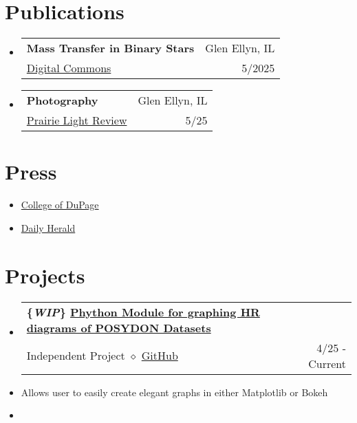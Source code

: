\documentclass[letterpaper,11pt]{article}
\makeatletter
\newcommand{\cvitem}[1]{
  \item\small{
    {#1\vspace{-2pt}}
  }
}
\newcommand{\cvheading}[4]{
  \vspace{-2pt}\item
    \begin{tabular*}{\textwidth}[t]{l@{\extracolsep{\fill}}r}
      \textbf{#1} & #2 \\
      \small#3 & \small #4 \\
    \end{tabular*}\vspace{-7pt}
}
\newcommand{\cvheadingstart}{\begin{itemize}[leftmargin=0in, label={}]}
\newcommand{\cvheadingend}{\end{itemize}}
\newcommand{\cvitemstart}{\begin{itemize}[label=\textopenbullet]\justifying}
\newcommand{\cvitemend}{\end{itemize}\vspace{-5pt}}
\makeatother
\begin{document}
\section{Publications}
  \cvheadingstart
  \cvheading
    {Mass Transfer in Binary Stars}
    {Glen Ellyn, IL}
    {\href{https://dc.cod.edu/srs/2025/schedule/25/}{Digital Commons}}
    {5/2025}
  \cvheading{Photography}{Glen Ellyn, IL}{\href{https://prairielightreview.squarespace.com/}{Prairie Light Review}}{5/25}
  \cvheadingend

\section{Press}

  \cvitemstart
  \cvitem{\href{https://www.cod.edu/about/stories/students/lipschultz.html}{College of DuPage}}
  \cvitem{\href{https://www.dailyherald.com/20250326/submitted-content/stories-of-space-and-college-of-dupage-students-advance-space-exploration-with-weather-balloon-launc/}{Daily Herald}}
  \cvitemend

\section{Projects}
\cvheadingstart
\cvheading{\{\textbf{\textit{WIP}}\} \href{https://piersonlip.github.io/Posydon_HR_Graphing_Script/}{Phython Module for graphing HR diagrams of POSYDON Datasets}}{}{Independent Project $\diamond$ \href{https://github.com/PiersonLip/Posydon_HR_Graphing_Script}{GitHub}}{4/25 - Current}
\cvheadingend
\cvitemstart
  \cvitem{Allows user to easily create elegant graphs in either Matplotlib or Bokeh}
  \cvitem{}
\cvitemend
\end{document}
